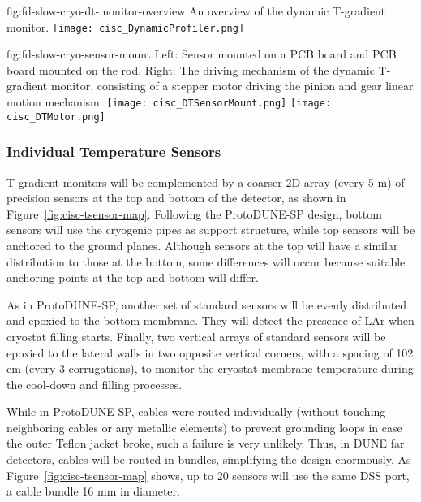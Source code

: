 \begin{dunefigure}{fig:fd-slow-cryo-dt-monitor-overview}
  {An overview of the dynamic T-gradient monitor.}
 \texttt{[image: cisc\_DynamicProfiler.png]}
\end{dunefigure}
\begin{dunefigure}{fig:fd-slow-cryo-sensor-mount}
  {Left: Sensor mounted on a PCB board and PCB board mounted on the rod. Right:
    The driving mechanism of the dynamic T-gradient monitor, consisting of a stepper motor driving the pinion and gear linear motion mechanism. }
  \texttt{[image: cisc\_DTSensorMount.png]}
  \hspace{3cm}%
  \texttt{[image: cisc\_DTMotor.png]}
\end{dunefigure}

\subsubsection{Individual Temperature Sensors}

T-gradient monitors will be complemented by a coarser 2D array (every 5 m) of precision sensors at the top and bottom of the detector, as shown in Figure~\ref{fig:cisc-tsensor-map}. Following the ProtoDUNE-SP design, bottom sensors will use the cryogenic pipes as support structure, while top sensors will be anchored to the ground planes. Although sensors at the top will have a similar distribution to those at the bottom, some differences will occur because suitable anchoring points at the top and bottom will differ. 

As in ProtoDUNE-SP, another set of standard sensors will be evenly distributed and epoxied to the bottom membrane. They will detect the presence of LAr when cryostat filling starts. Finally, two vertical arrays of standard sensors will be epoxied to the lateral walls in two opposite vertical corners, with a spacing of 102 cm (every 3 corrugations), to monitor the cryostat membrane temperature during the cool-down and filling processes. 

While in ProtoDUNE-SP, cables were routed individually (without touching neighboring cables or any metallic elements) to prevent grounding loops in case the outer Teflon jacket broke, such a failure is very unlikely. Thus, in DUNE far detectors, cables will be routed in bundles, simplifying the design enormously. As Figure~\ref{fig:cisc-tsensor-map} shows, up to 20 sensors will use the same DSS port, a cable bundle 16 mm in diameter.

